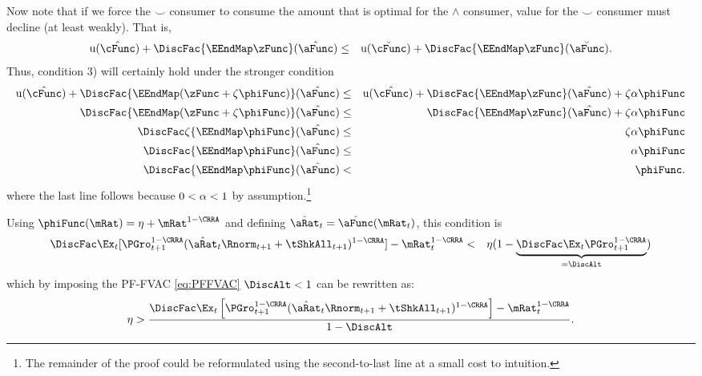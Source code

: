 \documentclass[titlepage]{\econtex}\providecommand{\texname}{BufferStockTheory}%
\begin{document}
Now note that if we force the $\smile$ consumer to consume the amount that is
optimal for the $\wedge$ consumer, value for the $\smile$ consumer must decline (at least weakly).  That is,
\begin{eqnarray*}
\util(\hat{\cFunc})+\DiscFac \{\EEndMap \zFunc \}(\hat{\aFunc})  & \leq &\util(\breve{\cFunc})+\DiscFac \{\EEndMap \zFunc \}(\breve{\aFunc})
.
\end{eqnarray*}
Thus, condition 3) will certainly hold under the stronger condition
\begin{eqnarray*}
\util(\hat{\cFunc})+\DiscFac\{\EEndMap (\zFunc+\zeta \phiFunc) \}(\hat{\aFunc})  & \leq & \util(\hat{\cFunc})+\DiscFac\{\EEndMap \zFunc \}(\hat{\aFunc})  + \zeta \Shrinker \phiFunc
\\ \DiscFac\{\EEndMap (\zFunc+\zeta \phiFunc) \}(\hat{\aFunc})  & \leq & \DiscFac\{\EEndMap \zFunc  \}(\hat{\aFunc})  + \zeta \Shrinker \phiFunc
\\ \DiscFac\zeta \{\EEndMap \phiFunc \}(\hat{\aFunc})  & \leq & \zeta \Shrinker \phiFunc
\\ \DiscFac\{\EEndMap \phiFunc \}(\hat{\aFunc})  & \leq & \Shrinker \phiFunc
\\ \DiscFac\{\EEndMap \phiFunc \}(\hat{\aFunc})  & < & \phiFunc \label{eq:reqCondWeak}
.
\end{eqnarray*}
where the last line follows because $0 < \alpha < 1$ by assumption.\footnote{The remainder of the proof could be reformulated using the second-to-last line at a small cost to intuition.}
  
Using $\phiFunc(\mRat)= \eta + \mRat^{1-\CRRA}$
and defining $\hat{\aRat}_{t}=\hat{\aFunc}(\mRat_{t})$, this condition is
\begin{eqnarray*}
\DiscFac \Ex_{t}[{\PGro}_{t+1}^{1-\CRRA}(\hat{\aRat}_{t}\Rnorm_{t+1}+\tShkAll_{t+1})^{1-\CRRA}]-\mRat_{t}^{1-\CRRA} & < & \eta(1-\underbrace{\DiscFac\Ex_{t}{\PGro}_{t+1}^{1-\CRRA}}_{=\DiscAlt})
\end{eqnarray*}
which by imposing the
 PF-FVAC \eqref{eq:PFFVAC} 
  $\DiscAlt<1$ can be rewritten as:
\begin{eqnarray}
 \eta>\frac{\DiscFac \Ex_{t}\left[{\PGro}_{t+1}^{1-\CRRA}(\hat{\aRat}_{t}\Rnorm_{t+1}+\tShkAll_{t+1})^{1-\CRRA}\right]-\mRat_{t}^{1-\CRRA}}{1-\DiscAlt}\label{eq:KeyCondition}.
\end{eqnarray}
\end{document}
